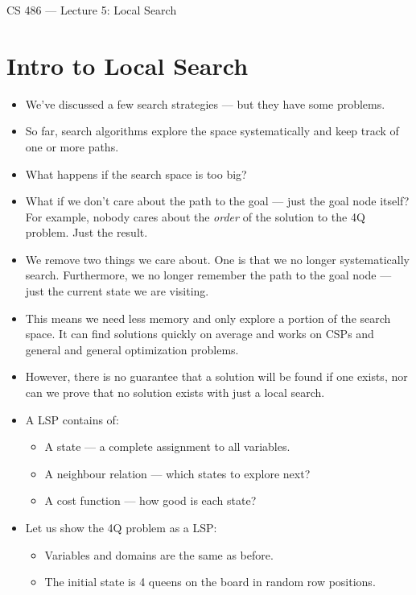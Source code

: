 \documentclass{article}
\author{Clement Tsang}
\begin{document}
\begin{center}
    \Large{CS 486 --- Lecture 5: Local Search}
\end{center}

\section{Intro to Local Search}
\begin{itemize}
    \item We've discussed a few search strategies --- but they have some problems.
    \item So far, search algorithms explore the space systematically and keep track of one or  more paths.
    \item What happens if the search space is too big?
    \item What if we don't care about the path to the goal --- just the goal node itself?  For example, nobody cares about the \emph{order} of the solution to the 4Q problem.  Just the result.
    \item We remove two things we care about.  One is that we no longer systematically search.  Furthermore, we no longer remember the path to the goal node --- just the current state we are visiting.
    \item This means we need less memory and only explore a portion of the search space.  It can find solutions quickly on average and works on CSPs and general and general optimization problems.
    \item However, there is no guarantee that a solution will be found if one exists, nor can we prove that no solution exists with just a local search.
    \item A LSP contains of:
        \begin{itemize}
            \item A state --- a complete assignment to all variables.
            \item A neighbour relation --- which states to explore next?
            \item A cost function --- how good is each state?
        \end{itemize}
    \item Let us show the 4Q problem as a LSP:
        \begin{itemize}
            \item Variables and domains are the same as before.
            \item The initial state is 4 queens on the board in random row positions.

\end{itemize}
\end{itemize}
\end{document}
